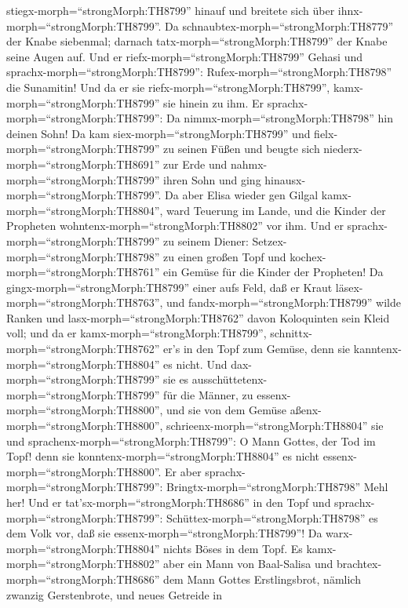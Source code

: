 stiegx-morph=``strongMorph:TH8799'' hinauf und breitete sich über
ihnx-morph=``strongMorph:TH8799''. Da
schnaubtex-morph=``strongMorph:TH8779'' der Knabe siebenmal; darnach
tatx-morph=``strongMorph:TH8799'' der Knabe seine Augen auf.
 Und er riefx-morph=``strongMorph:TH8799'' Gehasi und
sprachx-morph=``strongMorph:TH8799'': Rufex-morph=``strongMorph:TH8798''
die Sunamitin! Und da er sie riefx-morph=``strongMorph:TH8799'',
kamx-morph=``strongMorph:TH8799'' sie hinein zu ihm. Er
sprachx-morph=``strongMorph:TH8799'': Da
nimmx-morph=``strongMorph:TH8798'' hin deinen Sohn!  Da kam
siex-morph=``strongMorph:TH8799'' und fielx-morph=``strongMorph:TH8799''
zu seinen Füßen und beugte sich niederx-morph=``strongMorph:TH8691'' zur
Erde und nahmx-morph=``strongMorph:TH8799'' ihren Sohn und ging
hinausx-morph=``strongMorph:TH8799''.  Da aber Elisa wieder
gen Gilgal kamx-morph=``strongMorph:TH8804'', ward Teuerung im Lande,
und die Kinder der Propheten wohntenx-morph=``strongMorph:TH8802'' vor
ihm. Und er sprachx-morph=``strongMorph:TH8799'' zu seinem Diener:
Setzex-morph=``strongMorph:TH8798'' zu einen großen Topf und
kochex-morph=``strongMorph:TH8761'' ein Gemüse für die Kinder der
Propheten!  Da gingx-morph=``strongMorph:TH8799'' einer
aufs Feld, daß er Kraut läsex-morph=``strongMorph:TH8763'', und
fandx-morph=``strongMorph:TH8799'' wilde Ranken und
lasx-morph=``strongMorph:TH8762'' davon Koloquinten sein Kleid voll; und
da er kamx-morph=``strongMorph:TH8799'',
schnittx-morph=``strongMorph:TH8762'' er's in den Topf zum Gemüse, denn
sie kanntenx-morph=``strongMorph:TH8804'' es nicht.  Und
dax-morph=``strongMorph:TH8799'' sie es
ausschüttetenx-morph=``strongMorph:TH8799'' für die Männer, zu
essenx-morph=``strongMorph:TH8800'', und sie von dem Gemüse
aßenx-morph=``strongMorph:TH8800'',
schrieenx-morph=``strongMorph:TH8804'' sie und
sprachenx-morph=``strongMorph:TH8799'': O Mann Gottes, der Tod im Topf!
denn sie konntenx-morph=``strongMorph:TH8804'' es nicht
essenx-morph=``strongMorph:TH8800''.  Er aber
sprachx-morph=``strongMorph:TH8799'':
Bringtx-morph=``strongMorph:TH8798'' Mehl her! Und er
tat'sx-morph=``strongMorph:TH8686'' in den Topf und
sprachx-morph=``strongMorph:TH8799'':
Schüttex-morph=``strongMorph:TH8798'' es dem Volk vor, daß sie
essenx-morph=``strongMorph:TH8799''! Da
warx-morph=``strongMorph:TH8804'' nichts Böses in dem Topf.
 Es kamx-morph=``strongMorph:TH8802'' aber ein Mann von
Baal-Salisa und brachtex-morph=``strongMorph:TH8686'' dem Mann Gottes
Erstlingsbrot, nämlich zwanzig Gerstenbrote, und neues Getreide in
